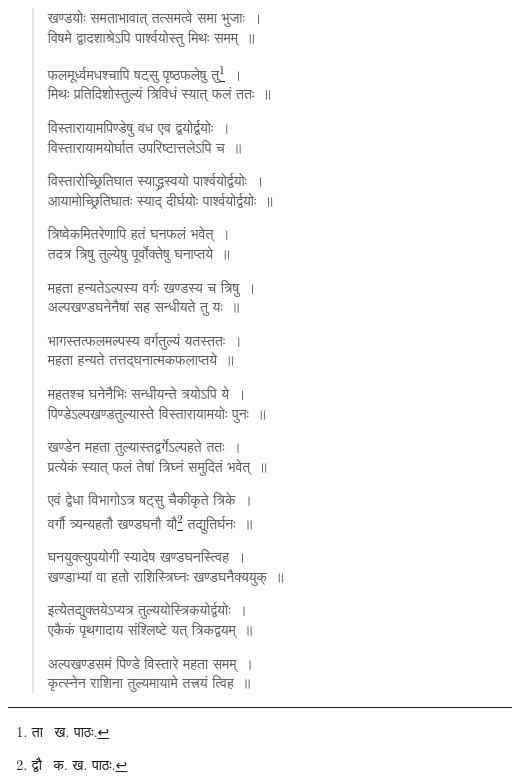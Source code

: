 \documentclass[11pt, openany]{book}
\begin{document}
\begin{quote}
{\qt खण्डयोः समताभावात् तत्समत्वे समा भुजाः~।\\
विषमे द्वादशाश्रेऽपि पार्श्वयोस्तु मिथः समम्~॥\

फलमूर्ध्वमधश्चापि षट्सु पृष्ठफलेषु तु\renewcommand{\thefootnote}{१}\footnote{ता \textendash\ ख. पाठः.}~। \\
मिथः प्रतिदिशोस्तुल्यं त्रिविधं स्यात् फलं ततः~॥

विस्तारायामपिण्डेषु वध एव द्वयोर्द्वयोः~।\\
विस्तारायामयोर्घात उपरिष्टात्तलेऽपि च~॥

विस्तारोच्छ्रितिघात स्याद्ध्रस्वयो पार्श्वयोर्द्वयोः~। \\
आयामोच्छ्रितिघातः स्याद् दीर्घयोः पार्श्वयोर्द्वयोः~॥

त्रिष्वेकमितरेणापि हतं घनफलं भवेत्~।\\
तदत्र त्रिषु तुल्येषु पूर्वोक्तेषु घनाप्तये~॥ 

महता हन्यतेऽल्पस्य वर्गः खण्डस्य च त्रिषु~। \\
अल्पखण्डघनेनैषां सह सन्धीयते तु यः~॥
 
भागस्तत्फलमल्पस्य वर्गतुल्यं यतस्ततः~।\\
महता हन्यते तत्तद्घनात्मकफलाप्तये~॥

महतश्च घनेनैभिः सन्धीयन्ते त्रयोऽपि ये~।\\
पिण्डेऽल्पखण्डतुल्यास्ते विस्तारायामयोः पुनः~॥

खण्डेन महता तुल्यास्तद्वर्गेऽल्पहते ततः~।\\
प्रत्येकं स्यात् फलं तेषां त्रिघ्नं समुदितं भवेत्~॥

एवं द्वेधा विभागोऽत्र षट्सु चैकीकृते त्रिके~।\\
वर्गौ त्र्यन्यहतौ खण्डघनौ यौ\renewcommand{\thefootnote}{२}\footnote{द्वौ \textendash\ क. ख. पाठः.} तद्युतिर्घनः~॥ 

घनयुक्त्युपयोगी स्यादेष खण्डघनस्त्विह~। \\
खण्डाभ्यां वा हतो राशिस्त्रिघ्नः खण्डघनैक्ययुक्~॥ 

इत्येतद्युक्तयेऽप्यत्र तुल्ययोस्त्रिकयोर्द्वयोः~।\\
एकैकं पृथगादाय संश्लिष्टे यत् त्रिकद्वयम्~॥

अल्पखण्डसमं पिण्डे विस्तारे महता समम्~।\\
कृत्स्नेन राशिना तुल्यमायामे तत्त्रयं त्विह~॥}
\end{quote}

\newpage
\end{document}
